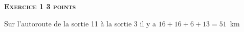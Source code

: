 \textbf{\textsc{Exercice 1 \hfill 3 points}}

\medskip

%
%
%
%
%
%
%
%
%
%
Sur l'autoroute de la sortie 11 à la sortie 3 il y a $16 + 16 +  6 + 13 = 51$~km

